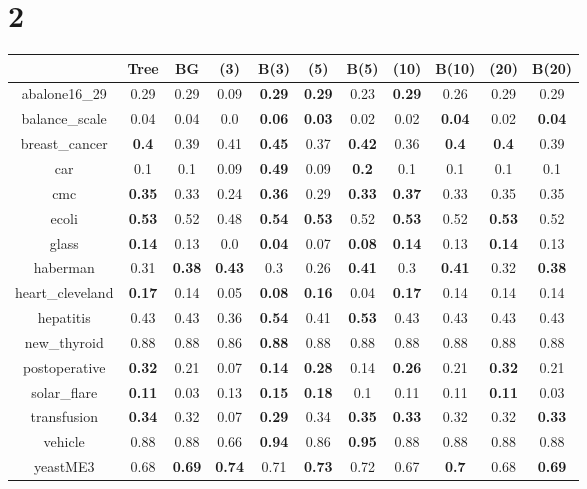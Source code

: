\documentclass{article}%
\begin{document}
\section*{2}%
\begin{tabular}{c|cccccccccc}%
\hline%
&Tree&BG&(3)&B(3)&(5)&B(5)&(10)&B(10)&(20)&B(20)\\%
\hline%
abalone16\_29&0.29&0.29&0.09&\textbf{0.29}&\textbf{0.29}&0.23&\textbf{0.29}&0.26&0.29&0.29\\%
\hline%
balance\_scale&0.04&0.04&0.0&\textbf{0.06}&\textbf{0.03}&0.02&0.02&\textbf{0.04}&0.02&\textbf{0.04}\\%
\hline%
breast\_cancer&\textbf{0.4}&0.39&0.41&\textbf{0.45}&0.37&\textbf{0.42}&0.36&\textbf{0.4}&\textbf{0.4}&0.39\\%
\hline%
car&0.1&0.1&0.09&\textbf{0.49}&0.09&\textbf{0.2}&0.1&0.1&0.1&0.1\\%
\hline%
cmc&\textbf{0.35}&0.33&0.24&\textbf{0.36}&0.29&\textbf{0.33}&\textbf{0.37}&0.33&0.35&0.35\\%
\hline%
ecoli&\textbf{0.53}&0.52&0.48&\textbf{0.54}&\textbf{0.53}&0.52&\textbf{0.53}&0.52&\textbf{0.53}&0.52\\%
\hline%
glass&\textbf{0.14}&0.13&0.0&\textbf{0.04}&0.07&\textbf{0.08}&\textbf{0.14}&0.13&\textbf{0.14}&0.13\\%
\hline%
haberman&0.31&\textbf{0.38}&\textbf{0.43}&0.3&0.26&\textbf{0.41}&0.3&\textbf{0.41}&0.32&\textbf{0.38}\\%
\hline%
heart\_cleveland&\textbf{0.17}&0.14&0.05&\textbf{0.08}&\textbf{0.16}&0.04&\textbf{0.17}&0.14&0.14&0.14\\%
\hline%
hepatitis&0.43&0.43&0.36&\textbf{0.54}&0.41&\textbf{0.53}&0.43&0.43&0.43&0.43\\%
\hline%
new\_thyroid&0.88&0.88&0.86&\textbf{0.88}&0.88&0.88&0.88&0.88&0.88&0.88\\%
\hline%
postoperative&\textbf{0.32}&0.21&0.07&\textbf{0.14}&\textbf{0.28}&0.14&\textbf{0.26}&0.21&\textbf{0.32}&0.21\\%
\hline%
solar\_flare&\textbf{0.11}&0.03&0.13&\textbf{0.15}&\textbf{0.18}&0.1&0.11&0.11&\textbf{0.11}&0.03\\%
\hline%
transfusion&\textbf{0.34}&0.32&0.07&\textbf{0.29}&0.34&\textbf{0.35}&\textbf{0.33}&0.32&0.32&\textbf{0.33}\\%
\hline%
vehicle&0.88&0.88&0.66&\textbf{0.94}&0.86&\textbf{0.95}&0.88&0.88&0.88&0.88\\%
\hline%
yeastME3&0.68&\textbf{0.69}&\textbf{0.74}&0.71&\textbf{0.73}&0.72&0.67&\textbf{0.7}&0.68&\textbf{0.69}\\%

\end{tabular}
\end{document}
